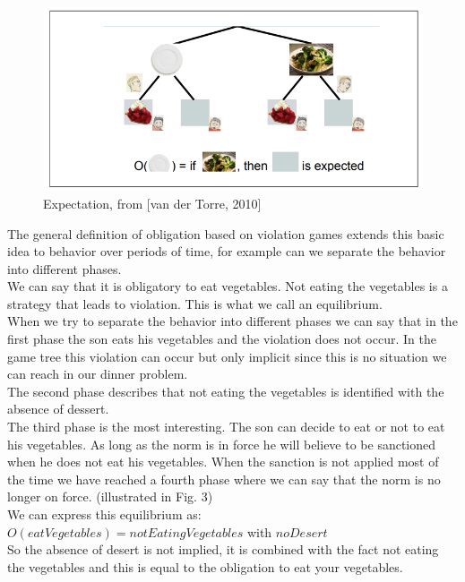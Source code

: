 \documentclass[conference]{IEEE}
\begin{document}
\begin{center}
\begin{figure}
    \centering
    \includegraphics[scale=0.8]{2.png}
    \caption{Expectation, from [van der Torre, 2010]}
    \label{fig:my_label}
\end{figure}
\end{center}

The general definition of obligation based on violation games extends this basic idea to behavior over periods of time, for example can we separate the behavior into different phases.\\
We can say that it is obligatory to eat vegetables. Not eating the vegetables is a strategy that leads to violation. This is what we call an equilibrium.\\
When we try to separate the behavior into different phases we can say that in the first phase the son eats his vegetables and the violation does not occur. In the game tree this violation can occur but only implicit since this is no situation we can reach in our dinner problem.\\
The second phase describes that not eating the vegetables is identified with the absence of dessert.\\
The third phase is the most interesting. The son can decide to eat or not to eat his vegetables. As long as the norm is in force he will believe to be sanctioned when he does not eat his vegetables. When the sanction is not applied most of the time we have reached a fourth phase where we can say that the norm is no longer on force. (illustrated in Fig. 3)\\
We can express this equilibrium as:\\
$O(eatVegetables) = notEatingVegetables$ with $noDesert$\\
So the absence of desert is not implied, it is combined with the fact not eating the vegetables and this is equal to the obligation to eat your vegetables.\\
\end{document}
